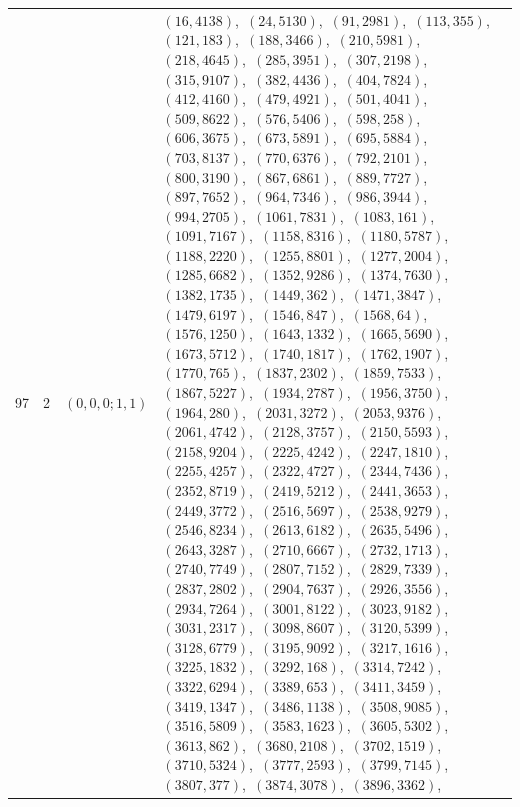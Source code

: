 \documentclass[11pt]{article}
\begin{document}
\begin{longtable}{@{}rrl>{\raggedright\arraybackslash}p{}@{}}
97 & 2 & $(0,0,0;1,1)$ & $(16,4138)$,\allowbreak\ $(24,5130)$,\allowbreak\ $(91,2981)$,\allowbreak\ $(113,355)$,\allowbreak\ $(121,183)$,\allowbreak\ $(188,3466)$,\allowbreak\ $(210,5981)$,\allowbreak\ $(218,4645)$,\allowbreak\ $(285,3951)$,\allowbreak\ $(307,2198)$,\allowbreak\ $(315,9107)$,\allowbreak\ $(382,4436)$,\allowbreak\ $(404,7824)$,\allowbreak\ $(412,4160)$,\allowbreak\ $(479,4921)$,\allowbreak\ $(501,4041)$,\allowbreak\ $(509,8622)$,\allowbreak\ $(576,5406)$,\allowbreak\ $(598,258)$,\allowbreak\ $(606,3675)$,\allowbreak\ $(673,5891)$,\allowbreak\ $(695,5884)$,\allowbreak\ $(703,8137)$,\allowbreak\ $(770,6376)$,\allowbreak\ $(792,2101)$,\allowbreak\ $(800,3190)$,\allowbreak\ $(867,6861)$,\allowbreak\ $(889,7727)$,\allowbreak\ $(897,7652)$,\allowbreak\ $(964,7346)$,\allowbreak\ $(986,3944)$,\allowbreak\ $(994,2705)$,\allowbreak\ $(1061,7831)$,\allowbreak\ $(1083,161)$,\allowbreak\ $(1091,7167)$,\allowbreak\ $(1158,8316)$,\allowbreak\ $(1180,5787)$,\allowbreak\ $(1188,2220)$,\allowbreak\ $(1255,8801)$,\allowbreak\ $(1277,2004)$,\allowbreak\ $(1285,6682)$,\allowbreak\ $(1352,9286)$,\allowbreak\ $(1374,7630)$,\allowbreak\ $(1382,1735)$,\allowbreak\ $(1449,362)$,\allowbreak\ $(1471,3847)$,\allowbreak\ $(1479,6197)$,\allowbreak\ $(1546,847)$,\allowbreak\ $(1568,64)$,\allowbreak\ $(1576,1250)$,\allowbreak\ $(1643,1332)$,\allowbreak\ $(1665,5690)$,\allowbreak\ $(1673,5712)$,\allowbreak\ $(1740,1817)$,\allowbreak\ $(1762,1907)$,\allowbreak\ $(1770,765)$,\allowbreak\ $(1837,2302)$,\allowbreak\ $(1859,7533)$,\allowbreak\ $(1867,5227)$,\allowbreak\ $(1934,2787)$,\allowbreak\ $(1956,3750)$,\allowbreak\ $(1964,280)$,\allowbreak\ $(2031,3272)$,\allowbreak\ $(2053,9376)$,\allowbreak\ $(2061,4742)$,\allowbreak\ $(2128,3757)$,\allowbreak\ $(2150,5593)$,\allowbreak\ $(2158,9204)$,\allowbreak\ $(2225,4242)$,\allowbreak\ $(2247,1810)$,\allowbreak\ $(2255,4257)$,\allowbreak\ $(2322,4727)$,\allowbreak\ $(2344,7436)$,\allowbreak\ $(2352,8719)$,\allowbreak\ $(2419,5212)$,\allowbreak\ $(2441,3653)$,\allowbreak\ $(2449,3772)$,\allowbreak\ $(2516,5697)$,\allowbreak\ $(2538,9279)$,\allowbreak\ $(2546,8234)$,\allowbreak\ $(2613,6182)$,\allowbreak\ $(2635,5496)$,\allowbreak\ $(2643,3287)$,\allowbreak\ $(2710,6667)$,\allowbreak\ $(2732,1713)$,\allowbreak\ $(2740,7749)$,\allowbreak\ $(2807,7152)$,\allowbreak\ $(2829,7339)$,\allowbreak\ $(2837,2802)$,\allowbreak\ $(2904,7637)$,\allowbreak\ $(2926,3556)$,\allowbreak\ $(2934,7264)$,\allowbreak\ $(3001,8122)$,\allowbreak\ $(3023,9182)$,\allowbreak\ $(3031,2317)$,\allowbreak\ $(3098,8607)$,\allowbreak\ $(3120,5399)$,\allowbreak\ $(3128,6779)$,\allowbreak\ $(3195,9092)$,\allowbreak\ $(3217,1616)$,\allowbreak\ $(3225,1832)$,\allowbreak\ $(3292,168)$,\allowbreak\ $(3314,7242)$,\allowbreak\ $(3322,6294)$,\allowbreak\ $(3389,653)$,\allowbreak\ $(3411,3459)$,\allowbreak\ $(3419,1347)$,\allowbreak\ $(3486,1138)$,\allowbreak\ $(3508,9085)$,\allowbreak\ $(3516,5809)$,\allowbreak\ $(3583,1623)$,\allowbreak\ $(3605,5302)$,\allowbreak\ $(3613,862)$,\allowbreak\ $(3680,2108)$,\allowbreak\ $(3702,1519)$,\allowbreak\ $(3710,5324)$,\allowbreak\ $(3777,2593)$,\allowbreak\ $(3799,7145)$,\allowbreak\ $(3807,377)$,\allowbreak\ $(3874,3078)$,\allowbreak\ $(3896,3362)$,\allowbreak\ 
\end{longtable}
\end{document}

